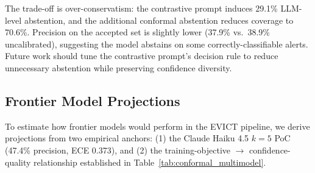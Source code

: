 The trade-off is over-conservatism: the contrastive prompt induces 29.1\% LLM-level abstention, and the additional conformal abstention reduces coverage to 70.6\%. Precision on the accepted set is slightly lower (37.9\% vs.\ 38.9\% uncalibrated), suggesting the model abstains on some correctly-classifiable alerts. Future work should tune the contrastive prompt's decision rule to reduce unnecessary abstention while preserving confidence diversity.

\subsection{Frontier Model Projections}
\label{sec:frontier_projections}

To estimate how frontier models would perform in the EVICT pipeline, we derive projections from two empirical anchors: (1) the Claude Haiku 4.5 $k=5$ PoC (47.4\% precision, ECE 0.373), and (2) the training-objective $\to$ confidence-quality relationship established in Table~\ref{tab:conformal_multimodel}.

\begin{table}[t]
\centering
\caption{Projected performance of frontier models in the EVICT pipeline, derived from the Claude Haiku 4.5 anchor ($k{=}5$ PoC) and the training-objective $\to$ confidence-quality relationship. ``Calib.\ benefit'' is the estimated precision gain from conformal calibration. Estimates carry $\pm$5pp uncertainty.}
\label{tab:frontier_proj}
\small
\setlength{\tabcolsep}{4pt}
\end{table}

